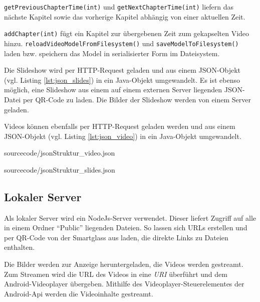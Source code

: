 \texttt{getPreviousChapterTime(int)} und \texttt{getNextChapterTime(int)} liefern das nächste Kapitel sowie das vorherige Kapitel abhängig von einer aktuellen Zeit. 

\texttt{addChapter(int)} fügt ein Kapitel zur übergebenen Zeit zum gekapselten Video hinzu. 
\texttt{reloadVideoModelFromFilesystem()} und \texttt{saveModelToFilesystem()} laden bzw. speichern das Model in serialisierter Form im Dateisystem.

Die Slideshow wird per HTTP-Request geladen und aus einem JSON-Objekt (vgl. Listing \ref{lst:json_slides}) in ein Java-Objekt umgewandelt. Es ist ebenso möglich, eine Slideshow aus einem auf einem externen Server liegenden JSON-Datei per QR-Code zu laden. Die Bilder der Slideshow werden von einem Server geladen.

Videos können ebenfalls per HTTP-Request geladen werden und aus einem JSON-Objekt (vgl. Listing \ref{lst:json_video}) in ein Java-Objekt umgewandelt. 

\begin{minipage}{\linewidth}
\begin{lstinputlisting}[%
    caption={JSON-Struktur des Videos},%
    captionpos=b, %
    label={lst:json_video},%
    language=json,%
    firstnumber=1, %
    basicstyle=\scriptsize, %
    breaklines=true]
{sourcecode/jsonStruktur_video.json}
\end{lstinputlisting}
\end{minipage}
%
\begin{minipage}{\linewidth}
\begin{lstinputlisting}[%
    caption={JSON-Struktur der Slides},%
    captionpos=b, %
    label={lst:json_slides},%
    language=json,%
    firstnumber=1, %
    basicstyle=\scriptsize, %
    breaklines=true]
{sourcecode/jsonStruktur_slides.json}
\end{lstinputlisting}
\end{minipage}
%
%
%
%
%
%
\subsection{Lokaler Server}
\label{sec:Lokaler_Server}
Als lokaler Server wird ein NodeJs-Server verwendet. Dieser liefert Zugriff auf alle in einem Ordner \enquote{Public} liegenden Dateien. So lassen sich URLs erstellen und per QR-Code von der Smartglass aus laden, die direkte Links zu Dateien enthalten.

Die Bilder werden zur Anzeige heruntergeladen, die Videos werden gestreamt. Zum Streamen wird die URL des Videos in eine \emph{URI} überführt und dem Android-Videoplayer übergeben. Mithilfe des Videoplayer-Steuerelementes der Android-Api werden die Videoinhalte gestreamt.

